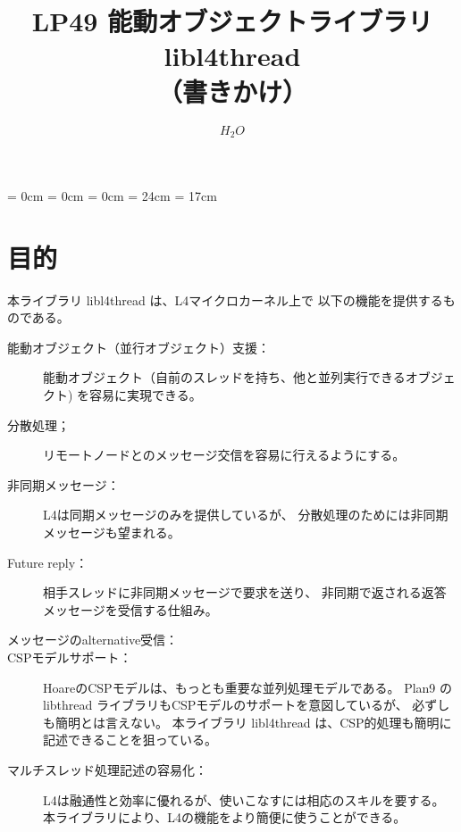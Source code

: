 


\topmargin = 0cm
\oddsidemargin = 0cm
\evensidemargin = 0cm
\textheight = 24cm
\textwidth = 17cm

\setcounter{secnumdepth}{2}



\title{\Large\bf  LP49 能動オブジェクトライブラリ libl4thread \\
        （書きかけ）}

\author{$H_2O$}



\maketitle

\section{目的}

本ライブラリ libl4thread は、L4マイクロカーネル上で
以下の機能を提供するものである。

\begin{description}
\item [能動オブジェクト（並行オブジェクト）支援：]
  能動オブジェクト（自前のスレッドを持ち、他と並列実行できるオブジェクト)
  を容易に実現できる。
\item [分散処理；]
  リモートノードとのメッセージ交信を容易に行えるようにする。
\item [非同期メッセージ：]
  L4は同期メッセージのみを提供しているが、
  分散処理のためには非同期メッセージも望まれる。
\item [Future reply：]
  相手スレッドに非同期メッセージで要求を送り、
  非同期で返される返答メッセージを受信する仕組み。
\item[メッセージのalternative受信：]

\item[CSPモデルサポート：]
  HoareのCSPモデルは、もっとも重要な並列処理モデルである。
  Plan9 のlibthread ライブラリもCSPモデルのサポートを意図しているが、
  必ずしも簡明とは言えない。
  本ライブラリ libl4thread は、CSP的処理も簡明に記述できることを狙っている。
\item [マルチスレッド処理記述の容易化：]
  L4は融通性と効率に優れるが、使いこなすには相応のスキルを要する。
  本ライブラリにより、L4の機能をより簡便に使うことができる。
\end{description}

